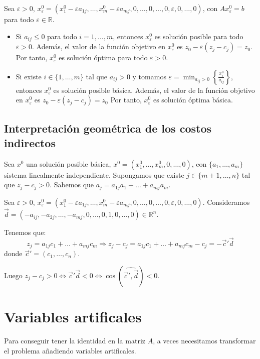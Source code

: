 Sea $\varepsilon > 0$, $x^0_\varepsilon = (x^0_1 - \varepsilon a_{1j}, \dots, x^0_m - \varepsilon a_{mj}, 0, \dots, 0, \dots, 0, \varepsilon, 0, \dots, 0)$, con $Ax^0_\varepsilon = b$ para todo $\varepsilon \in \mathbb{R}$.
\begin{itemize}
    \item Si $a_{ij} \leq 0$ para todo $i = 1, \dots, m$, entonces $x^0_\varepsilon$ es solución posible para todo $\varepsilon > 0$.
          Además, el valor de la función objetivo en $x^0_\varepsilon$ es $z_0 - \varepsilon(z_j-c_j) = z_0$.
          Por tanto, $x^0_\varepsilon$ es solución óptima para todo $\varepsilon > 0$.
    \item Si existe $i \in \{1, \dots, m\}$ tal que $a_{ij} > 0$ y tomamos $\varepsilon = \min_{a_{ij} > 0} \left\{\frac{x^0_i}{a_{ij}}\right\}$, entonces $x^0_\varepsilon$ es solución posible básica.
          Además, el valor de la función objetivo en $x^0_\varepsilon$ es $z_0 - \varepsilon(z_j-c_j) = z_0$
          Por tanto, $x^0_\varepsilon$ es solución óptima básica.
\end{itemize}

\subsection*{Interpretación geométrica de los costos indirectos}
Sea $x^0$ una solución posible básica, $x^0 = (x^0_1, \dots, x^0_m, 0, \dots, 0)$, con $\{a_1, \dots, a_m\}$ sistema linealmente independiente.
Supongamos que existe $j \in \{m+1, \dots, n\}$ tal que $z_j-c_j > 0$.
Sabemos que $a_j = a_{1j}a_1 + \dots + a_{mj}a_m$.

Sea $\varepsilon > 0$, $x^0_\varepsilon = (x^0_1 - \varepsilon a_{1j}, \dots, x^0_m - \varepsilon a_{mj}, 0, \dots, 0, \dots, 0, \varepsilon, 0, \dots, 0)$.
Consideramos $\vec{d} = (-a_{ij}, -a_{2j}, \dots, -a_{mj}, 0, \dots, 0, 1, 0, \dots, 0) \in \mathbb{R}^n$.

Tenemos que:
$$z_j = a_{1j}c_1 + \dots + a_{mj}c_m \Rightarrow z_j-c_j = a_{1j}c_1 + \dots + a_{mj}c_m - c_j = -\vec{c}'\vec{d}$$
donde $\vec{c}' = (c_1, \dots, c_n)$.

Luego $z_j - c_j > 0 \Leftrightarrow \vec{c}'\vec{d} < 0 \Leftrightarrow \cos(\widehat{\vec{c}', \vec{d}}) < 0$.

\section{Variables artificales}
Para conseguir tener la identidad en la matriz $A$, a veces necesitamos transformar el problema añadiendo variables artificales.


